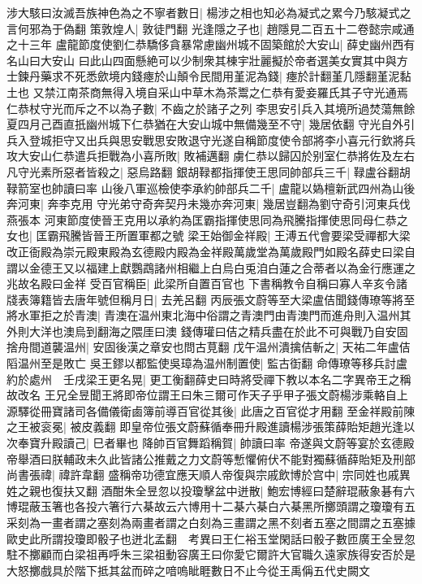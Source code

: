 涉大駭曰汝滅吾族神色為之不寧者數日|{
	楊涉之相也知必為凝式之累今乃駭凝式之言何邪為于偽翻}
策敦煌人|{
	敦徒門翻}
光逢隱之子也|{
	趙隱見二百五十二卷懿宗咸通之十三年}
盧龍節度使劉仁恭驕侈貪暴常慮幽州城不固築館於大安山|{
	薛史幽州西有名山曰大安山}
曰此山四面懸絶可以少制衆其棟宇壯麗擬於帝者選美女實其中與方士鍊丹藥求不死悉歛境内錢瘞於山顛令民間用堇泥為錢|{
	瘞於計翻堇几隱翻堇泥黏土也}
又禁江南茶商無得入境自采山中草木為茶鬻之仁恭有愛妾羅氏其子守光通焉仁恭杖守光而斥之不以為子數|{
	不齒之於諸子之列}
李思安引兵入其境所過焚蕩無餘夏四月己酉直扺幽州城下仁恭猶在大安山城中無備幾至不守|{
	幾居依翻}
守光自外引兵入登城拒守又出兵與思安戰思安敗退守光遂自稱節度使令部將李小喜元行欽將兵攻大安山仁恭遣兵拒戰為小喜所敗|{
	敗補邁翻}
虜仁恭以歸囚於别室仁恭將佐及左右凡守光素所惡者皆殺之|{
	惡烏路翻}
銀胡䩮都指揮使王思同帥部兵三千|{
	䩮盧谷翻胡䩮箭室也帥讀曰率}
山後八軍巡檢使李承約帥部兵二千|{
	盧龍以媯檀新武四州為山後}
奔河東|{
	奔李克用}
守光弟守奇奔契丹未幾亦奔河東|{
	幾居豈翻為劉守奇引河東兵伐燕張本}
河東節度使晉王克用以承約為匡霸指揮使思同為飛騰指揮使思同母仁恭之女也|{
	匡霸飛騰皆晉王所置軍都之號}
梁王始御金祥殿|{
	王溥五代會要梁受禪都大梁改正衙殿為崇元殿東殿為玄德殿内殿為金祥殿萬歲堂為萬歲殿門如殿名薛史曰梁自謂以金德王又以福建上獻鸚鵡諸州相繼上白烏白兎洎白蓮之合蒂者以為金行應運之兆故名殿曰金祥}
受百官稱臣|{
	此梁所自置百官也}
下書稱教令自稱曰寡人辛亥令諸牋表簿籍皆去唐年號但稱月日|{
	去羌呂翻}
丙辰張文蔚等至大梁盧佶聞錢傳璙等將至將水軍拒之於青澳|{
	青澳在温州東北海中俗謂之青澳門由青澳門而進舟則入温州其外則大洋也澳烏到翻海之隈厓曰澳}
錢傳瓘曰佶之精兵盡在於此不可與戰乃自安固捨舟間道襲温州|{
	安固後漢之章安也問古莧翻}
戊午温州潰擒佶斬之|{
	天祐二年盧佶䧟温州至是敗亡}
吳王鏐以都監使吳璋為温州制置使|{
	監古衘翻}
命傳璙等移兵討盧約於處州　壬戌梁王更名晃|{
	更工衡翻薛史曰時將受禪下教以本名二字異帝王之稱故改名}
王兄全昱聞王將即帝位謂王曰朱三爾可作天子乎甲子張文蔚楊涉乘輅自上源驛從冊寶諸司各備儀衛鹵簿前導百官從其後|{
	此唐之百官從才用翻}
至金祥殿前陳之王被衮冕|{
	被皮義翻}
即皇帝位張文蔚蘇循奉冊升殿進讀楊涉張策薛貽矩趙光逢以次奉寶升殿讀己|{
	巳者畢也}
降帥百官舞蹈稱賀|{
	帥讀曰率}
帝遂與文蔚等宴於玄德殿帝舉酒曰朕輔政未久此皆諸公推戴之力文蔚等慙懼俯伏不能對獨蘇循薛貽矩及刑部尚書張禕|{
	禕許韋翻}
盛稱帝功德宜應天順人帝復與宗戚飲博於宫中|{
	宗同姓也戚異姓之親也復扶又翻}
酒酣朱全昱忽以投瓊擊盆中迸散|{
	鮑宏博經曰楚辭琨蔽象碁有六博琨蔽玉箸也各投六箸行六棊故云六博用十二棊六棊白六棊黑所擲頭謂之瓊瓊有五采刻為一畫者謂之塞刻為兩畫者謂之白刻為三畫謂之黑不刻者五塞之間謂之五塞據歐史此所謂投瓊即骰子也迸北孟翻　考異曰王仁裕玉堂閑話曰骰子數匝廣王全昱忽駐不擲顧而白梁祖再呼朱三梁祖動容廣王曰你愛它爾許大官職久遠家族得安否於是大怒擲戲具於階下抵其盆而碎之喑嗚眦睚數日不止今從王禹偁五代史闕文}
